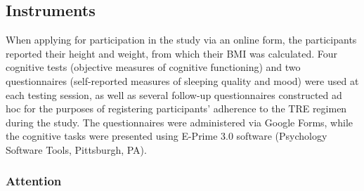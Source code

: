 \documentclass[authordate, empirical]{jote-new-article}
\begin{document}
\subsection{Instruments }



When applying for participation in the study via an online form, the participants reported their height and weight, from which their BMI was calculated. Four cognitive tests (objective measures of cognitive functioning) and two questionnaires (self-reported measures of sleeping quality and mood) were used at each testing session, as well as several follow-up questionnaires constructed ad hoc for the purposes of registering participants' adherence to the TRE regimen during the study. The questionnaires were administered via Google Forms, while the cognitive tasks were presented using E-Prime 3.0 software (Psychology Software Tools, Pittsburgh, PA).



\subsubsection{Attention}
\end{document}
